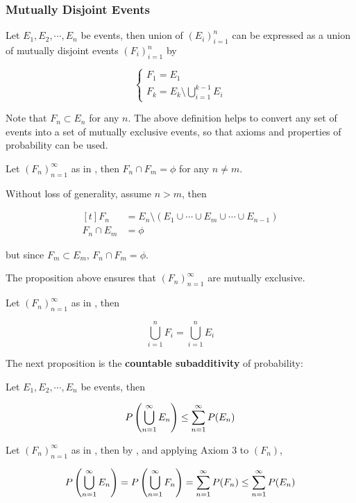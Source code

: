 \documentclass[a4paper,12pt]{article}
\begin{document}
\subsubsection{Mutually Disjoint Events}
\begin{dft}
  Let $E_{1},E_{2},\cdots,E_{n}$ be events, then union of $(E_{i})_{i=1}^{n}$ can be expressed as a union of mutually disjoint events $(F_{i})_{i=1}^{n}$ by

  $$\begin{cases}
    F_{1}=E_{1}\\
    F_{k}=E_{k}\setminus\bigcup_{i=1}^{k-1}E_{i}
  \end{cases}$$\s
\end{dft}\n

Note that $F_{n}\subset E_{n}$ for any $n$. The above definition helps to convert any set of events into a set of mutually exclusive events, so that axioms and properties of probability can be used.\n

\begin{pst}
  Let $(F_{n})_{n=1}^{\infty}$ as in \rdft[\sctr{1}], then $F_{n}\cap F_{m}=\phi$ for any $n\neq m$.\n

  \prf Without loss of generality, assume $n>m$, then

  $$\begin{aligned}[t]
    F_{n}&=E_{n}\setminus(E_{1}\cup\cdots\cup E_{m}\cup\cdots\cup E_{n-1})\\
    F_{n}\cap E_{m}&=\phi
  \end{aligned}$$\s

  but since $F_{m}\subset E_{m}$, $F_{n}\cap F_{m}=\phi$.
\end{pst}\n

The proposition above ensures that $(F_{n})_{n=1}^{\infty}$ are mutually exclusive.\n

\begin{pst}
  Let $(F_{n})_{n=1}^{\infty}$ as in \rdft[\sctr{2}], then
  
  $$\bigcup_{i=1}^{n}F_{i}=\bigcup_{i=1}^{n}E_{i}$$\s
\end{pst}

The next proposition is the \textbf{countable subadditivity} of probability:\n

\begin{pst}
  Let $E_{1},E_{2},\cdots,E_{n}$ be events, then

  $$P\left( \bigcup_{n=1}^{\infty}E_{n}\right)\leq\sum_{n=1}^{\infty}P(E_{n})$$\s

  \prf Let $(F_{n})_{n=1}^{\infty}$ as in \rdft[\sctr{3}], then by \rpst[\sctr{2}], \rpst[\sctr{1}] and applying Axiom $3$ to $(F_{n})$,

  $$P\left( \bigcup_{n=1}^{\infty}E_{n}\right)=P\left( \bigcup_{n=1}^{\infty}F_{n}\right)=\sum_{n=1}^{\infty}P(F_{n})\leq\sum_{n=1}^{\infty}P(E_{n})$$
\end{pst}\n
\end{document}
